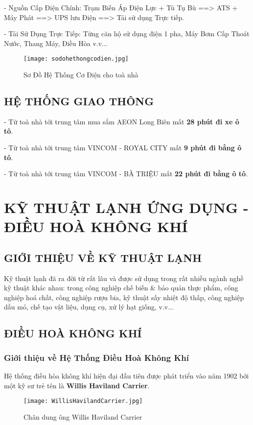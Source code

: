 	- Nguồn Cấp Điện Chính:
	Trạm Biến Áp Điện Lực + Tủ Tụ Bù ==> ATS + Máy Phát ==> UPS lưu Điện ==> Tải sử dụng Trực tiếp.
	
	- Tải Sử Dụng Trực Tiếp: Từng căn hộ sử dụng điện 1 pha, Máy Bơm Cấp Thoát Nước, Thang Máy, Điều Hòa v.v...
	
	\begin{figure}[H]
		\centering
		\caption{Sơ Đồ Hệ Thống Cơ Điện cho toà nhà}
		\texttt{[image: sodohethongcodien.jpg]}
	\end{figure}
	
	\subsection{HỆ THỐNG GIAO THÔNG}
	- Từ toà nhà tới trung tâm mua sắm AEON Long Biên mất \textbf{28 phút đi xe ô tô}.
	
	- Từ toà nhà tới trung tâm VINCOM - ROYAL CITY mất \textbf{9 phút đi bằng ô tô}.
	
	- Từ toà nhà tới trung tâm VINCOM - BÀ TRIỆU mất \textbf{22 phút đi bằng ô tô}.
	

	\section{KỸ THUẬT LẠNH ỨNG DỤNG - ĐIỀU HOÀ KHÔNG KHÍ}
	\subsection{GIỚI THIỆU VỀ KỸ THUẬT LẠNH}
	Kỹ thuật lạnh đã ra đời từ rất lâu và được sử dụng trong rất nhiều ngành nghề kỹ thuật khác nhau: trong công nghiệp chế biến \& bảo quản thực phẩm, công nghiệp hoá chất, công nghiệp rượu bia, kỹ thuật sấy nhiệt độ thấp, công nghiệp dầu mỏ, chế tạo vật liệu, dụng cụ, xử lý hạt giống, v.v...
	
	\subsection{ĐIỀU HOÀ KHÔNG KHÍ}
	\subsubsection{Giới thiệu về Hệ Thống Điều Hoà Không Khí}
	Hệ thống điều hòa không khí hiện đại đầu tiên được phát triển vào năm 1902 bởi một kỹ sư trẻ tên là \textbf{Willis Haviland Carrier}. 
	
	\begin{wrapfigure}{r}{0.3\textwidth}
		\texttt{[image: WillisHavilandCarrier.jpg]} 
		\caption{Chân dung ông Willis Haviland Carrier}
	\end{wrapfigure}

